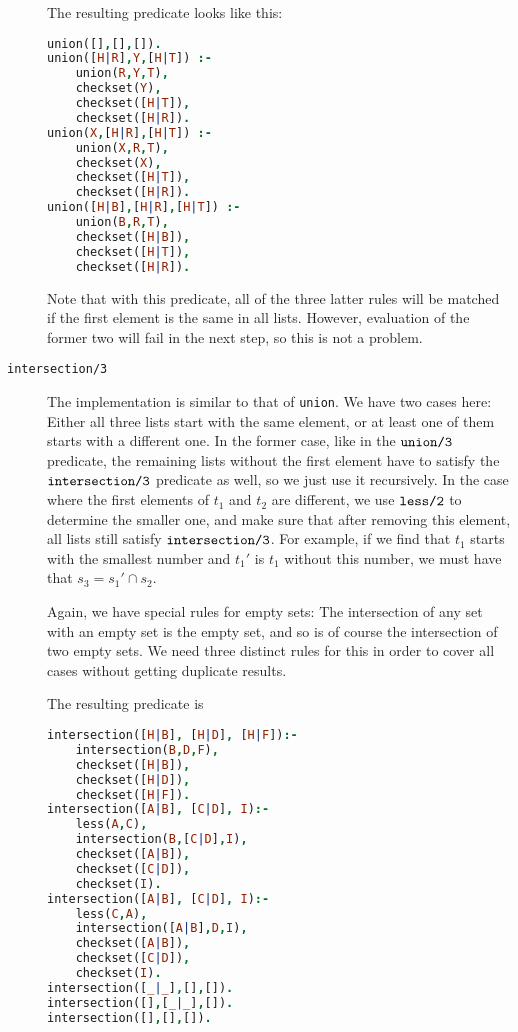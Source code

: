 \documentclass[a4paper]{article}
\newcommand{\pfuncn}[2]{\textnormal{\texttt{#1/#2}}\xspace}
\begin{document}
\begin{description}
  The resulting predicate looks like this:
  \begin{lstlisting}[language=prolog]
union([],[],[]).
union([H|R],Y,[H|T]) :- 
	union(R,Y,T),
	checkset(Y), 
	checkset([H|T]),
	checkset([H|R]).
union(X,[H|R],[H|T]) :- 
	union(X,R,T),
	checkset(X), 
	checkset([H|T]),
	checkset([H|R]).
union([H|B],[H|R],[H|T]) :- 
	union(B,R,T),
	checkset([H|B]), 
	checkset([H|T]),
	checkset([H|R]).
\end{lstlisting}

Note that with this predicate, all of the three latter rules will be matched if the first element is the same in all lists. However, evaluation of the former two will fail in the next step, so this is not a problem.
\item[\pfuncn{intersection}{3}] The implementation is similar to that of \texttt{union}. We have two cases here: Either all three lists start with the same element, or at least one of them starts with a different one. In the former case, like in the $\pfuncn{union}{3}$ predicate, the remaining lists without the first element have to satisfy the $\pfuncn{intersection}{3}$ predicate as well, so we just use it recursively. In the case where the first elements of $t_1$ and $t_2$ are different, we use $\pfuncn{less}{2}$ to determine the smaller one, and make sure that after removing this element, all lists still satisfy $\pfuncn{intersection}{3}$. For example, if we find that $t_1$ starts with the smallest number and $t_1'$ is $t_1$ without this number, we must have that $s_3 = s_1' \cap s_2$. 

Again, we have special rules for empty sets: The intersection of any set with an empty set is the empty set, and so is of course the intersection of two empty sets. We need three distinct rules for this in order to cover all cases without getting duplicate results. 

The resulting predicate is 
\begin{lstlisting}[language=prolog]
intersection([H|B], [H|D], [H|F]):-
	intersection(B,D,F),
	checkset([H|B]),
	checkset([H|D]),
	checkset([H|F]).
intersection([A|B], [C|D], I):-
	less(A,C),
	intersection(B,[C|D],I),
	checkset([A|B]),
	checkset([C|D]),
	checkset(I).
intersection([A|B], [C|D], I):-
	less(C,A),
	intersection([A|B],D,I),
	checkset([A|B]),
	checkset([C|D]),
	checkset(I).
intersection([_|_],[],[]).
intersection([],[_|_],[]).
intersection([],[],[]).
\end{lstlisting}
\end{description}
\end{document}
